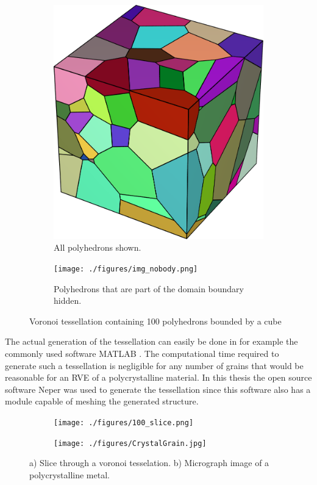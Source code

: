 \documentclass[micro_gen.tex]{subfiles}
\begin{document}
\begin{figure}
\centering
\begin{subfigure}[b]{.5\textwidth}
  \centering
  \includegraphics[width=.5\linewidth]{./figures/img_body.png}
  \caption{All polyhedrons shown.}
  \label{fig:pois_voronoi_a}
\end{subfigure}%
\begin{subfigure}[b]{.5\textwidth}
  \centering
  \texttt{[image: ./figures/img\_nobody.png]}
  \caption{Polyhedrons that are part of the domain boundary hidden.}
  \label{fig:pois_voronoi_b}
\end{subfigure}
\caption{Voronoi tessellation containing 100 polyhedrons bounded by a cube}
\label{fig:pois_voronoi}
\end{figure}


 The actual generation of the tessellation can easily be done in for example the commonly used software MATLAB \cite{matlab:voronoi}. The computational time required to generate such a tessellation is negligible for any number of grains that would be reasonable for an RVE of a polycrystalline material. In this thesis the open source software Neper \cite{Quey20111729} was used to generate the tessellation since this software also has a module capable of meshing the generated structure.

\begin{figure}
\centering
\begin{subfigure}[b]{.5\textwidth}
  \centering
  \texttt{[image: ./figures/100\_slice.png]}
  \caption{}
   \label{fig:slice_a}
\end{subfigure}%
\begin{subfigure}[b]{.5\textwidth}
  \centering
  \texttt{[image: ./figures/CrystalGrain.jpg]}
  \caption{}
  \label{fig:slice_b}
\end{subfigure}
\caption{a) Slice through a voronoi tesselation.  b) Micrograph image of a polycrystalline metal.\cite{wiki:grain}}
\label{fig:slice}
\end{figure}
\end{document}
